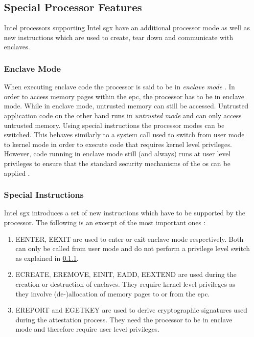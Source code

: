 \subsection{Special Processor Features}
Intel processors supporting Intel \ac{sgx} have an additional processor mode as well as new instructions which are used to create, tear down and communicate with enclaves.

\subsubsection{Enclave Mode}
\label{sec:EnclaveMode}
When executing enclave code the processor is said to be in \textit{enclave mode} \cite{Costan2016IntelSE}. In order to access memory pages within the \ac{epc}, the processor has to
be in enclave mode. While in enclave mode, untrusted memory can still be accessed. Untrusted application code on the other hand runs in \textit{untrusted mode} and can only
access untrusted memory. Using special instructions the processor modes can be switched. This behaves similarly to a system call used to switch from user mode to kernel mode in 
order to execute code that requires kernel level privileges. However, code running in enclave mode still (and always) runs at user level privileges to ensure that the standard 
security mechanisms of the \ac{os} can be applied \cite{Costan2016IntelSE}.

\subsubsection{Special Instructions}
\label{sec:Instructions}
Intel \ac{sgx} introduces a set of new instructions which have to be supported by the processor. The following is an excerpt of the most important ones \cite{OverviewOfIntelSGX}:
\begin{enumerate}
    \item EENTER, EEXIT are used to enter or exit enclave mode respectively. Both can only be called from user mode and do not perform a privilege level switch as explained
          in \cref{sec:EnclaveMode}.
    \item ECREATE, EREMOVE, EINIT, EADD, EEXTEND are used during the creation or destruction of enclaves. They require kernel level privileges as they involve (de-)allocation
          of memory pages to or from the \ac{epc}.
    \item EREPORT and EGETKEY are used to derive cryptographic signatures used during the attestation process. They need the processor to be in enclave mode and therefore
          require user level privileges.
\end{enumerate}
